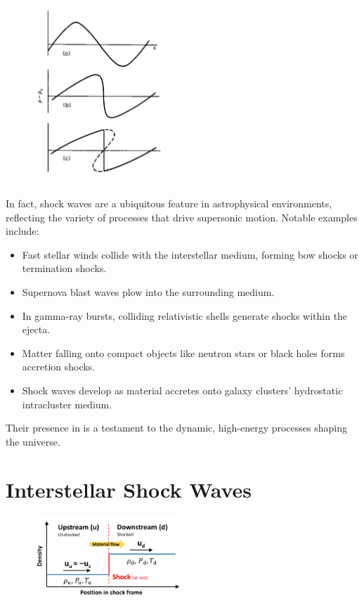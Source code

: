 \begin{figure}[!t]
\centering
\includegraphics[width=0.45\textwidth]{figures/shocklandau.pdf}
\caption{}
\label{fig:landau}
\end{figure}

In fact, shock waves are a ubiquitous feature in astrophysical environments, reflecting the variety of processes that drive supersonic motion. 
%
Notable examples include:
\begin{itemize}
\item Fast stellar winds collide with the interstellar medium, forming bow shocks or termination shocks.  
\item Supernova blast waves plow into the surrounding medium.  
\item In gamma-ray bursts, colliding relativistic shells generate shocks within the ejecta.  
\item Matter falling onto compact objects like neutron stars or black holes forms accretion shocks.  
\item Shock waves develop as material accretes onto galaxy clusters' hydrostatic intracluster medium.  
\end{itemize}

Their presence in is a testament to the dynamic, high-energy processes shaping the universe.

\section{Interstellar Shock Waves}

\begin{figure}[!t]
\centering
\includegraphics[width=0.5\textwidth]{figures/downupstream.pdf}
\caption{}
\end{figure}

